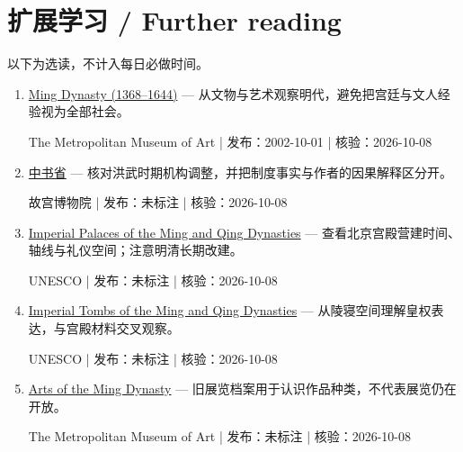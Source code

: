 \documentclass[11pt]{article}
\newcommand{\Needspace}[1]{\par\ifdim\dimexpr\pagegoal-\pagetotal\relax<#1\relax\newpage\fi}
\begin{document}
\Needspace{6\baselineskip}\section*{扩展学习 / Further reading}\small 以下为选读，不计入每日必做时间。\begin{enumerate}[leftmargin=1.6em]

\item [S1] \href{https://www.metmuseum.org/essays/ming-dynasty-1368-1644}{Ming Dynasty (1368–1644)} — 从文物与艺术观察明代，避免把宫廷与文人经验视为全部社会。\par The Metropolitan Museum of Art | 发布：2002-10-01 | 核验：2026-10-08

\item [S2] \href{https://www.dpm.org.cn/court/system/236406.html}{中书省} — 核对洪武时期机构调整，并把制度事实与作者的因果解释区分开。\par 故宫博物院 | 发布：未标注 | 核验：2026-10-08

\item [S3] \href{https://whc.unesco.org/en/list/439/}{Imperial Palaces of the Ming and Qing Dynasties} — 查看北京宫殿营建时间、轴线与礼仪空间；注意明清长期改建。\par UNESCO | 发布：未标注 | 核验：2026-10-08

\item [S4] \href{https://whc.unesco.org/en/list/1004/}{Imperial Tombs of the Ming and Qing Dynasties} — 从陵寝空间理解皇权表达，与宫殿材料交叉观察。\par UNESCO | 发布：未标注 | 核验：2026-10-08

\item [S5] \href{https://www.metmuseum.org/exhibitions/listings/2009/arts-of-the-ming-dynasty}{Arts of the Ming Dynasty} — 旧展览档案用于认识作品种类，不代表展览仍在开放。\par The Metropolitan Museum of Art | 发布：未标注 | 核验：2026-10-08

\end{enumerate}
\end{document}
